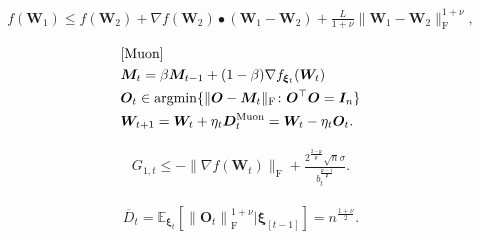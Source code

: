 \documentclass[10pt,a4paper]{amsart}
\newcommand{\argmin}{\operatornamewithlimits{argmin}}
\begin{document}
\begin{align}\label{g_descent_lemma_sum}
f(\bm{W}_1) 
\leq 
f(\bm{W}_2) + \nabla f (\bm{W}_2) \bullet (\bm{W}_1 - \bm{W}_2)
+ \frac{L}{1 + \nu}\| \bm{W}_1 - \bm{W}_2 \|_{\mathrm{F}}^{1 + \nu}, 
\end{align}

\begin{align}\label{Muon}
\begin{split}
&\text{[Muon]}\\
&\bm{M}_t = \beta \bm{M}_{t-1} + (1 - \beta) \nabla f_{\bm{\xi}_t} (\bm{W}_t)\\
&\bm{O}_t \in \argmin \{ \| \bm{O} - \bm{M}_t \|_{\mathrm{F}} \colon \bm{O}^\top \bm{O} = \bm{I}_n  \} \\
&\bm{W}_{t+1} 
= \bm{W}_t + \eta_t \bm{D}_t^{\mathrm{Muon}}
= \bm{W}_t - \eta_t \bm{O}_t.
\end{split}
\end{align}

\begin{align}\label{g_t_1}
G_{1,t} 
\leq 
- \| \nabla f (\bm{W}_t) \|_{\mathrm{F}}
+ \frac{2^{\frac{2 - \mathfrak{p}}{\mathfrak{p}}} \sqrt{n} \sigma}{b_t^{\frac{\mathfrak{p} -1}{\mathfrak{p}}}}.
\end{align}

\begin{align}\label{bar_d_t}
\overline{D}_t
= 
\mathbb{E}_{\bm{\xi}_t} \left[
\left\| \bm{O}_t \right\|_{\mathrm{F}}^{1 + \nu} \Big| \bm{\xi}_{[t-1]} \right]
= n^{\frac{1 + \nu}{2}}.
\end{align}
\end{document}
